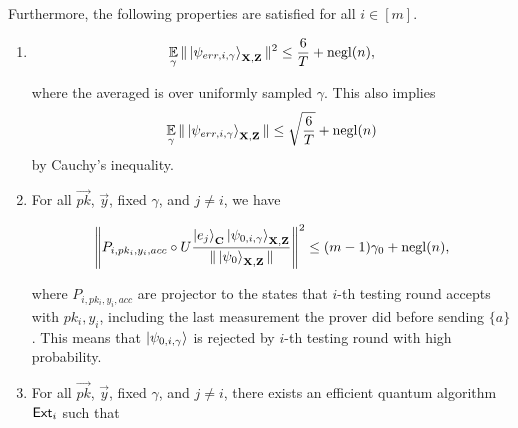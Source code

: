 \begin{lemma}
Furthermore, the following properties are satisfied for all $i\in[m]$.
%
\begin{enumerate}
    \item \label{property:partition-err}  $$\operatorname*{\mathbb{E}}_{\gamma}\|\ket{\psi_{err,i,\gamma}}_{\mathbf{X},\mathbf{Z}}\|^2 \leq \frac{6}{T}+\operatorname{negl}(n),$$
    
    where the averaged is over uniformly sampled $\gamma$. This also implies
    \begin{align}
        \operatorname*{\mathbb{E}}_{\gamma}\|\ket{\psi_{err,i,\gamma}}_{\mathbf{X},\mathbf{Z}}\| \leq \sqrt{\frac{6}{T}}+\operatorname{negl}(n)
    \end{align}
by Cauchy's inequality.
    
        \item \label{property:partition-testing}
For all $\vec{pk}$, $\vec{y}$, fixed $\gamma$, and  $j\neq i$, we have 
 

 \begin{align}
    \left\lVert P_{i,pk_i,y_i,acc} \circ U\frac{\ket{e_j}_{\mathbf{C}}\ket{\psi_{0,i,\gamma}}_{\mathbf{X},\mathbf{Z}}}{\|\ket{\psi_0}_{\mathbf{X},\mathbf{Z}}\|}\right\rVert^2 \leq (m-1)\gamma_0+\operatorname{negl}(n),
 \end{align}
 
 
where $P_{i,pk_i,y_i,acc}$ are projector to the states that $i$-th testing round accepts with $pk_i,y_i$, including the last measurement the prover did before sending $\{a\}$.  This means that $\ket{\psi_{0,i,\gamma}}$ is rejected by $i$-th testing round with high probability.


    \item \label{property:partition-binding}
    
For all $\vec{pk}$, $\vec{y}$, fixed $\gamma$, and $j\neq i$, there exists an efficient quantum algorithm $\mathsf{Ext}_i$ such that 


\end{enumerate}
\end{lemma}
